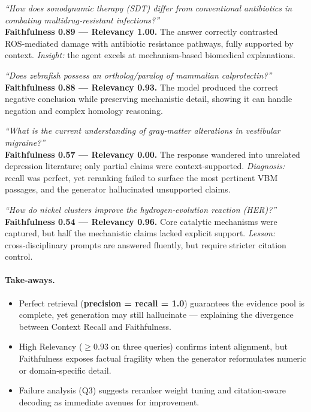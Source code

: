 \documentclass[conference]{IEEEtran}
\begin{document}
\begin{description}[leftmargin=1.5em,labelindent=0em]
  \item[\textbf{Q1}] \emph{``How does sonodynamic therapy (SDT) differ from conventional antibiotics in combating multidrug‑resistant infections?''}\\
    \textbf{Faithfulness 0.89 — Relevancy 1.00.}  
    The answer correctly contrasted ROS‑mediated damage with antibiotic resistance pathways, fully supported by context.  
    \textit{Insight:} the agent excels at mechanism‑based biomedical explanations.

  \item[\textbf{Q2}] \emph{``Does zebrafish possess an ortholog/paralog of mammalian calprotectin?''}\\
    \textbf{Faithfulness 0.88 — Relevancy 0.93.}  
    The model produced the correct negative conclusion while preserving mechanistic detail, showing it can handle negation and complex homology reasoning.

  \item[\textbf{Q3}] \emph{``What is the current understanding of gray‑matter alterations in vestibular migraine?''}\\
    \textbf{Faithfulness 0.57 — Relevancy 0.00.}  
    The response wandered into unrelated depression literature; only partial claims were context‑supported.  
    \textit{Diagnosis:} recall was perfect, yet reranking failed to surface the most pertinent VBM passages, and the generator hallucinated unsupported claims.

  \item[\textbf{Q4}] \emph{``How do nickel clusters improve the hydrogen‑evolution reaction (HER)?''}\\
    \textbf{Faithfulness 0.54 — Relevancy 0.96.}  
    Core catalytic mechanisms were captured, but half the mechanistic claims lacked explicit support.  
    \textit{Lesson:} cross‑disciplinary prompts are answered fluently, but require stricter citation control.
\end{description}

\paragraph{Take‑aways.}
\begin{itemize}
  \item Perfect retrieval (\textbf{precision = recall = 1.0}) guarantees the evidence pool is complete, yet generation may still hallucinate --- explaining the divergence between Context Recall and Faithfulness.
  \item High Relevancy ($\ge0.93$ on three queries) confirms intent alignment, but Faithfulness exposes factual fragility when the generator reformulates numeric or domain‑specific detail.
  \item Failure analysis (Q3) suggests reranker weight tuning and citation‑aware decoding as immediate avenues for improvement.
\end{itemize}
\end{document}

